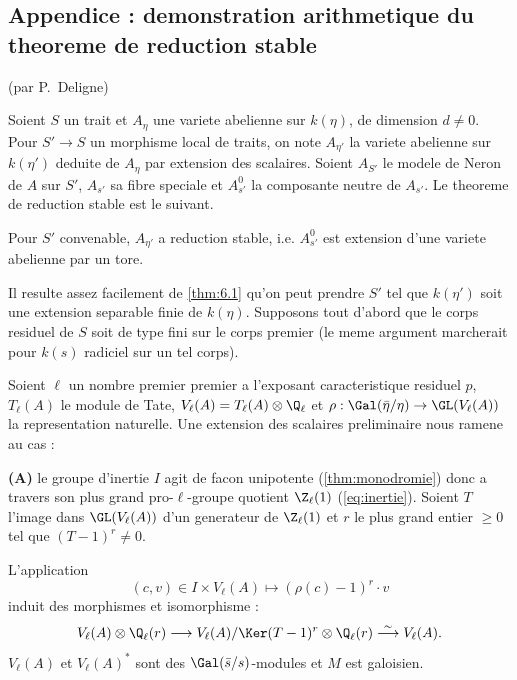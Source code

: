 \subsection{Appendice : demonstration arithmetique du theoreme de reduction stable}
\label{subsec:appendice-reduction}

(par P.~Deligne)

Soient $S$ un trait et $A_\eta$ une variete abelienne sur $k(\eta)$, de dimension $d \neq 0$. Pour $S' \to S$ un morphisme local de traits, on note $A_{\eta'}$ la variete abelienne sur $k(\eta')$ deduite de $A_\eta$ par extension des scalaires. Soient $A_{S'}$ le modele de Neron de $A$ sur $S'$, $A_{s'}$ sa fibre speciale et $A_{s'}^0$ la composante neutre de $A_{s'}$. Le theoreme de reduction stable est le suivant.

\begin{theorem}
\label{thm:6.1}
Pour $S'$ convenable, $A_{\eta'}$ a reduction stable, i.e. $A_{s'}^0$ est extension d'une variete abelienne par un tore.
\end{theorem}

Il resulte assez facilement de \ref{thm:6.1} qu'on peut prendre $S'$ tel que $k(\eta')$ soit une extension separable finie de $k(\eta)$. Supposons tout d'abord que le corps residuel de $S$ soit de type fini sur le corps premier (le meme argument marcherait pour $k(s)$ radiciel sur un tel corps).

Soient $\ell$ un nombre premier premier a l'exposant caracteristique residuel $p$, $T_\ell(A)$ le module de Tate, $V_\ell(A) = T_\ell(A) \otimes \Q_\ell$ et $\rho: \Gal(\bar{\eta}/\eta) \to \GL(V_\ell(A))$ la representation naturelle. Une extension des scalaires preliminaire nous ramene au cas :

\textbf{(A)} le groupe d'inertie $I$ agit de facon unipotente (\ref{thm:monodromie}) donc a travers son plus grand pro-$\ell$-groupe quotient $\Z_\ell(1)$ (\ref{eq:inertie}). Soient $T$ l'image dans $\GL(V_\ell(A))$ d'un generateur de $\Z_\ell(1)$ et $r$ le plus grand entier $\geqslant 0$ tel que $(T-1)^r \neq 0$.

\begin{lemma}
\label{lem:6.2}
L'application
\[
(c, v) \in I \times V_\ell(A) \longmapsto (\rho(c) - 1)^r \cdot v
\]
induit des morphismes et isomorphisme :
\begin{equation}
\label{eq:6.2.1}
V_\ell(A) \otimes \Q_\ell(r) \longrightarrow V_\ell(A)/\Ker(T-1)^r \otimes \Q_\ell(r) \overset{\sim}{\longrightarrow} V_\ell(A).
\end{equation}
$V_\ell(A)$ et $V_\ell(A)^*$ sont des $\Gal(\bar{s}/s)$-modules et $M$ est galoisien.
\end{lemma}

